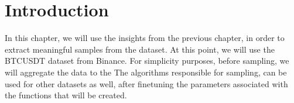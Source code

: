 
\section{Introduction}

In this chapter, we will use the insights from the previous chapter, in order to extract meaningful samples from the dataset. At this point, we will use the BTCUSDT dataset from Binance. For simplicity purposes, before sampling, we will aggregate the data to the The algorithms responsible for sampling, can be used for other datasets as well, after finetuning the parameters associated with the functions that will be created.  
